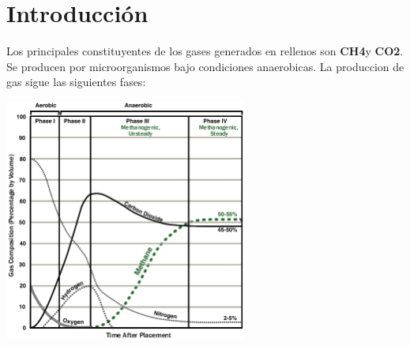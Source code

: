 \subtitle{Emisiones en rellenos sanitarios}
\begin{frame}
  \titlepage
\end{frame}

\section{Introducción}

\begin{frame}{}

	Los principales constituyentes de los gases generados en rellenos son \textbf{CH4}y \textbf{CO2}. 
	Se producen por microorganismos bajo condiciones anaerobicas.
	La produccion de gas sigue las siguientes fases:
        \begin{center}
            \includegraphics[width=0.6\textwidth]{img/landfillgas.png}
        \end{center}

\end{frame}
